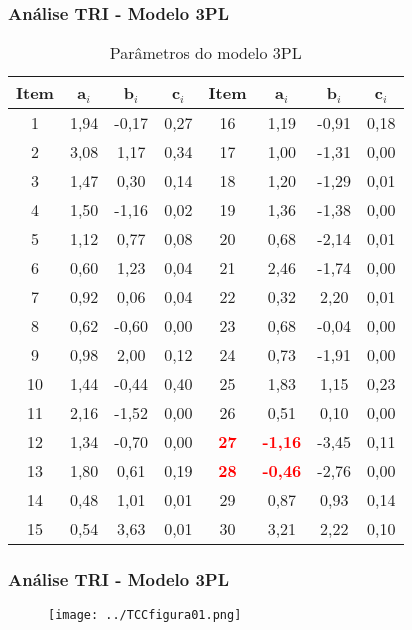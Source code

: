 \documentclass{beamer}
\begin{document}
\begin{frame}
	\frametitle{Análise TRI - Modelo 3PL}
	\scriptsize %
	\begin{table}[H]
		\centering
		\caption{Parâmetros do modelo 3PL}
		\begin{tabular*}{0.95\textwidth}{@{\extracolsep{\fill}}cccc|cccc}
			\hline
			\textbf{Item} & \textbf{a$_i$} & \textbf{b$_i$} & \textbf{c$_i$} & \textbf{Item} &  \textbf{a$_i$} & \textbf{b$_i$} & \textbf{c$_i$} \\ 
			\hline
			1 & 1,94 & -0,17 & 0,27 & 16 & 1,19 & -0,91 & 0,18 \\ 
			2 & 3,08 & 1,17 & 0,34 & 17 & 1,00 & -1,31 & 0,00 \\ 
			3 & 1,47 & 0,30 & 0,14 & 18 & 1,20 & -1,29 & 0,01 \\ 
			4 & 1,50 & -1,16 & 0,02 & 19 & 1,36 & -1,38 & 0,00 \\ 
			5 & 1,12 & 0,77 & 0,08 & 20 & 0,68 & -2,14 & 0,01 \\ 
			6 & 0,60 & 1,23 & 0,04 & 21 & 2,46 & -1,74 & 0,00 \\ 
			7 & 0,92 & 0,06 & 0,04 & 22 & 0,32 & 2,20 & 0,01 \\ 
			8 & 0,62 & -0,60 & 0,00 & 23 & 0,68 & -0,04 & 0,00 \\ 
			9 & 0,98 & 2,00 & 0,12 & 24 & 0,73 & -1,91 & 0,00 \\ 
			10 & 1,44 & -0,44 & 0,40 & 25 & 1,83 & 1,15 & 0,23 \\ 
			11 & 2,16 & -1,52 & 0,00 & 26 & 0,51 & 0,10 & 0,00 \\ 
			12 & 1,34 & -0,70 & 0,00 & \textbf{\textcolor{red}{27}} & \textbf{\textcolor{red}{-1,16}} & -3,45 & 0,11 \\ 
			13 & 1,80 & 0,61 & 0,19 & \textbf{\textcolor{red}{28}} & \textbf{\textcolor{red}{-0,46}} & -2,76 & 0,00 \\ 
			14 & 0,48 & 1,01 & 0,01 & 29 & 0,87 & 0,93 & 0,14 \\ 
			15 & 0,54 & 3,63 & 0,01 & 30 & 3,21 & 2,22 & 0,10 \\ 
			\hline
		\end{tabular*}
	\end{table}
\end{frame}


	
\begin{frame}
		
		\frametitle{Análise TRI - Modelo 3PL}
		
		\begin{figure}
			\texttt{[image: ../TCCfigura01.png]}
		\end{figure}
		
	\end{frame}
	
\end{document}
